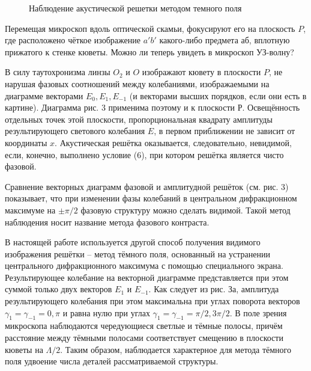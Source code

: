 \documentclass[14pt]{article}
\begin{document}
\begin{figure}[h!]
	\caption{Наблюдение акустической решетки методом темного поля}
	\label{fig:image}
\end{figure}

Перемещая микроскоп вдоль оптической скамьи, фокусируют его на плоскость $P$, где расположено чёткое изображение $a'b'$ какого-либо предмета аб, вплотную прижатого к стенке кюветы. Можно ли теперь увидеть в микроскоп УЗ-волну?

В силу таутохронизма линзы $O_2$ и $O$ изображают кювету в плоскости $P$, не нарушая фазовых соотношений между колебаниями, изображаемыми на диаграмме векторами $E_0, E_1, E_{-1}$ (и векторами высших порядков, если они есть в картине). Диаграмма рис. 3 применима поэтому и к плоскости Р. Освещённость отдельных точек этой плоскости, пропорциональная квадрату амплитуды результирующего светового колебания $E$, в первом приближении не зависит от координаты $x$. Акустическая решётка оказывается, следовательно, невидимой, если, конечно, выполнено условие (6), при котором решётка является чисто фазовой.

Сравнение векторных диаграмм фазовой и амплитудной решёток (см. рис. 3) показывает, что при изменении фазы колебаний в центральном дифракционном максимуме на $\pm\pi/2$ фазовую структуру можно сделать видимой. Такой метод наблюдения носит название метода фазового контраста.

В настоящей работе используется другой способ получения видимого изображения решётки -- метод тёмного поля, основанный на устранении центрального дифракционного максимума с помощью специального экрана. Результирующее колебание на векторной диаграмме представляется при этом суммой только двух векторов $E_1$ и $E_{-1}$. Как следует из рис. За, амплитуда результирующего колебания при этом максимальна при углах поворота векторов $\gamma_1 = \gamma_{-1} = 0,\pi$ и равна нулю при углах $\gamma_1 = \gamma_{-1} = \pi/2, 3\pi/2$. В поле зрения микроскопа наблюдаются чередующиеся светлые и тёмные полосы, причём расстояние между тёмными полосами соответствует смещению в плоскости кюветы на $\Lambda/2$. Таким образом, наблюдается характерное для метода тёмного поля удвоение числа деталей рассматриваемой структуры.
\end{document}
